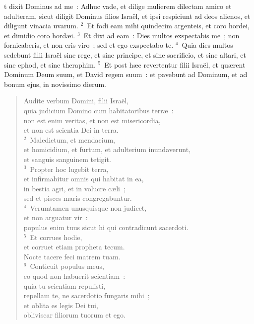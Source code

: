 \bchapter
{}t dixit Dominus ad me~: Adhuc vade, et dilige mulierem dilectam amico et adulteram, sicut diligit Dominus filios Isra\"el, et ipsi respiciunt ad deos alienos, et diligunt vinacia uvarum.
${}^{2}$~Et fodi eam mihi quindecim argenteis, et coro hordei, et dimidio coro hord\ae i.
${}^{3}$~Et dixi ad eam~: Dies multos exspectabis me~; non fornicaberis, et non eris viro~; sed et ego exspectabo te.
${}^{4}$~Quia dies multos sedebunt filii Isra\"el sine rege, et sine principe, et sine sacrificio, et sine altari, et sine ephod, et sine theraphim.
${}^{5}$~Et post h\ae c revertentur filii Isra\"el, et qu\ae rent Dominum Deum suum, et David regem suum~: et pavebunt ad Dominum, et ad bonum ejus, in novissimo dierum.
\begin{flushleft}\begin{verse}\vspace{-19pt}Audite verbum Domini, filii Isra\"el,\\ quia judicium Domino cum habitatoribus terr\ae~:\\ non est enim veritas, et non est misericordia,\\ et non est scientia Dei in terra.\\
${}^{2}$~Maledictum, et mendacium,\\ et homicidium, et furtum, et adulterium inundaverunt,\\ et sanguis sanguinem tetigit.\\
${}^{3}$~Propter hoc lugebit terra,\\ et infirmabitur omnis qui habitat in ea,\\ in bestia agri, et in volucre c\ae li~;\\ sed et pisces maris congregabuntur.\\
${}^{4}$~Verumtamen unusquisque non judicet,\\ et non arguatur vir~:\\ populus enim tuus sicut hi qui contradicunt sacerdoti.\\
${}^{5}$~Et corrues hodie,\\ et corruet etiam propheta tecum.\\ Nocte tacere feci matrem tuam.\\
${}^{6}$~Conticuit populus meus,\\ eo quod non habuerit scientiam~:\\ quia tu scientiam repulisti,\\ repellam te, ne sacerdotio fungaris mihi~;\\ et oblita es legis Dei tui,\\ obliviscar filiorum tuorum et ego.\\

\end{verse}
\end{flushleft}
